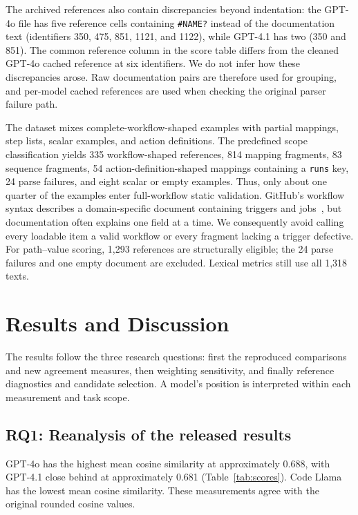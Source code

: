 The archived references also contain discrepancies beyond indentation: the GPT-4o file has five reference cells containing \texttt{\#NAME?} instead of the documentation text (identifiers 350, 475, 851, 1121, and 1122), while GPT-4.1 has two (350 and 851). The common reference column in the score table differs from the cleaned GPT-4o cached reference at six identifiers. We do not infer how these discrepancies arose. Raw documentation pairs are therefore used for grouping, and per-model cached references are used when checking the original parser failure path.

The dataset mixes complete-workflow-shaped examples with partial mappings, step lists, scalar examples, and action definitions. The predefined scope classification yields 335 workflow-shaped references, 814 mapping fragments, 83 sequence fragments, 54 action-definition-shaped mappings containing a \texttt{runs} key, 24 parse failures, and eight scalar or empty examples. Thus, only about one quarter of the examples enter full-workflow static validation. GitHub's workflow syntax describes a domain-specific document containing triggers and jobs~\cite{githubsyntax}, but documentation often explains one field at a time. We consequently avoid calling every loadable item a valid workflow or every fragment lacking a trigger defective. For path--value scoring, 1,293 references are structurally eligible; the 24 parse failures and one empty document are excluded. Lexical metrics still use all 1,318 texts.

\section{Results and Discussion}
The results follow the three research questions: first the reproduced comparisons and new agreement measures, then weighting sensitivity, and finally reference diagnostics and candidate selection. A model's position is interpreted within each measurement and task scope.

\subsection{RQ1: Reanalysis of the released results}


GPT-4o has the highest mean cosine similarity at approximately 0.688, with GPT-4.1 close behind at approximately 0.681 (Table~\ref{tab:scores}). Code Llama has the lowest mean cosine similarity. These measurements agree with the original rounded cosine values.

